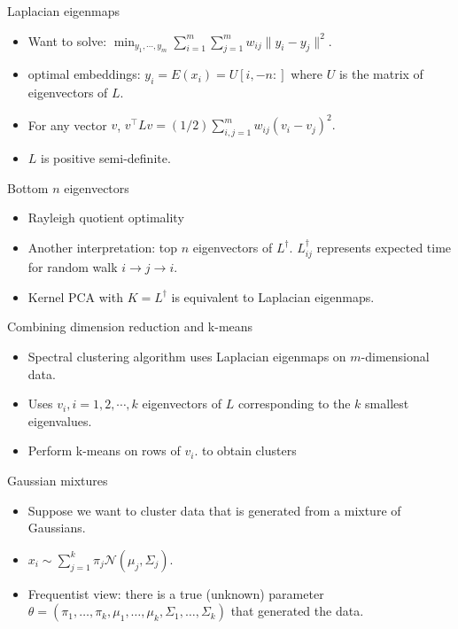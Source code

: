 \documentclass[final]{beamer}
\begin{document}
\begin{frame}{Laplacian eigenmaps}
	\begin{itemize}
		\item Want to solve: $\min_{y_1,\cdots,y_m} \sum_{i=1}^m \sum_{j=1}^m w_{ij} \|y_i - y_j\|^2.$
		\pause
		\item optimal embeddings: $y_i = E(x_i) = U[i,-n:]$ where $U$ is the matrix of eigenvectors of $L$.
		\pause
		\item For any vector $v$, $v^\top L v = (1/2)\sum_{i, j=1}^m w_{ij} (v_i - v_j)^2.$
		\pause
		\item $L$ is positive semi-definite.
	\end{itemize}
\end{frame}
\begin{frame}{Bottom $n$ eigenvectors}
	\begin{itemize}
		\item Rayleigh quotient optimality
		\pause
		\item Another interpretation: top $n$ eigenvectors of $L^\dagger.$ $L^\dagger_{ij}$ represents expected time for random walk $i \to j \to i.$ 
		\pause
		\item Kernel PCA with $K = L^\dagger$ is equivalent to Laplacian eigenmaps. 
	\end{itemize}
\end{frame}
\begin{frame}{Combining dimension reduction and k-means}
	\begin{itemize}
		\item Spectral clustering algorithm uses Laplacian eigenmaps on $m$-dimensional data.
		\pause
		\item Uses $v_i, i = 1,2,\cdots,k$ eigenvectors of $L$ corresponding to the $k$ smallest eigenvalues.
		\pause
		\item Perform k-means on rows of $v_i.$ to obtain clusters
	\end{itemize}
\end{frame}
\begin{frame}{Gaussian mixtures}
	\begin{itemize}
		\item Suppose we want to cluster data that is generated from a mixture of Gaussians.
		\pause
		\item $x_i \sim \sum_{j=1}^k \pi_j \mathcal{N}(\mu_j, \Sigma_j).$
		\pause
	\item Frequentist view: there is a true (unknown) parameter $\theta = (\pi_1, \ldots, \pi_k, \mu_1, \ldots, \mu_k, \Sigma_1, \ldots, \Sigma_k)$ that generated the data.
	\end{itemize}
\end{frame}
\end{document}
